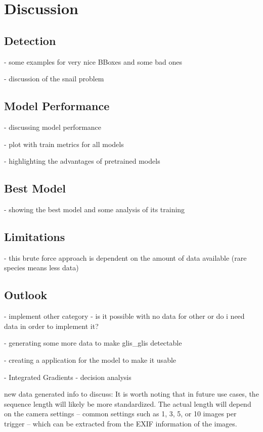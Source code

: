 


\section{Discussion}
\label{discussion}

    \subsection{Detection}
    - some examples for very nice BBoxes and some bad ones

    - discussion of the snail problem

    \subsection{Model Performance}
    - discussing model performance

    - plot with train metrics for all models

    - highlighting the advantages of pretrained models

    \subsection{Best Model}
    - showing the best model and some analysis of its training

    \subsection{Limitations}
    - this brute force approach is dependent on the amount of data available (rare species means less data)

    \subsection{Outlook}
    - implement other category - is it possible with no data for other or do i need data in order to implement it?

    - generating some more data to make glis\_glis detectable

    - creating a application for the model to make it usable

    - Integrated Gradients - decision analysis


    new data generated info to discuss:
    It is worth noting that in future use cases, the sequence length will likely be more standardized.
    The actual length will depend on the camera settings -- common settings such as 1, 3, 5, or 10 images per trigger -- which can be extracted from the EXIF information of the images.